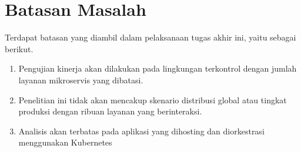 \section{Batasan Masalah}
\label{sec:batasan-masalah}

Terdapat batasan yang diambil dalam pelaksanaan tugas akhir ini, yaitu sebagai berikut.

\begin{enumerate}
    \item Pengujian kinerja akan dilakukan pada lingkungan terkontrol dengan jumlah layanan mikroservis yang dibatasi. 
    \item Penelitian ini tidak akan mencakup skenario distribusi global atau tingkat produksi dengan ribuan layanan yang berinteraksi.
    \item Analisis akan terbatas pada aplikasi yang dihosting dan diorkestrasi menggunakan Kubernetes
 \end{enumerate}

